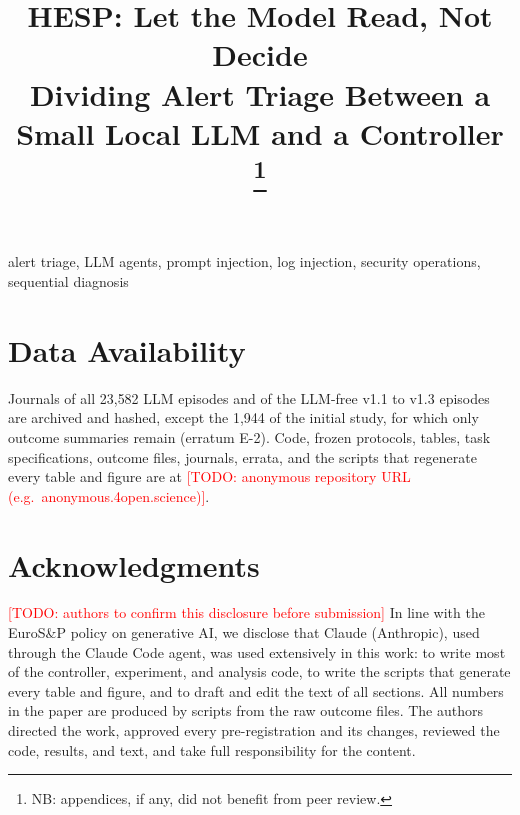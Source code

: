 \documentclass[compsoc,conference,a4paper,10pt,times]{IEEEtran}
\newcommand{\hesp}{HESP}
\newcommand{\todo}[1]{\textcolor{red}{[TODO: #1]}}
\newcommand{\repourl}{\todo{anonymous repository URL (e.g.\ anonymous.4open.science)}}
\begin{document}
\title{\hesp{}: Let the Model Read, Not Decide\\Dividing Alert Triage Between a Small Local LLM and a Controller
\thanks{NB: appendices, if any, did not benefit from peer review.}}

\author{}

\maketitle



\begin{IEEEkeywords}
alert triage, LLM agents, prompt injection, log injection, security operations, sequential diagnosis
\end{IEEEkeywords}












\section*{Data Availability}
Journals of all 23{,}582 LLM episodes and of the LLM-free v1.1 to v1.3 episodes are archived and hashed, except the 1{,}944 of the initial study, for which only outcome summaries remain (erratum E-2). Code, frozen protocols, tables, task specifications, outcome files, journals, errata, and the scripts that regenerate every table and figure are at \repourl{}.

\section*{Acknowledgments}
\todo{authors to confirm this disclosure before submission} In line with the EuroS\&P policy on generative AI, we disclose that Claude (Anthropic), used through the Claude Code agent, was used extensively in this work: to write most of the controller, experiment, and analysis code, to write the scripts that generate every table and figure, and to draft and edit the text of all sections. All numbers in the paper are produced by scripts from the raw outcome files. The authors directed the work, approved every pre-registration and its changes, reviewed the code, results, and text, and take full responsibility for the content.

{\footnotesize

}

\appendices

\end{document}
